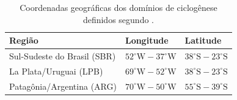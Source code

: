 \begin{table}[ht]
\centering
\caption[Coordenadas dos domínios de ciclogênese]{Coordenadas geográficas dos domínios de ciclogênese definidos segundo \citet{gramcianinov2019properties}.}
\label{tab:regiones_coords}
\begin{tabular*}{\textwidth}{@{\extracolsep{\fill}}lll}
\hline
Região & Longitude & Latitude \\
\hline
Sul-Sudeste do Brasil (SBR) & $52^\circ\text{W} - 37^\circ\text{W}$ & $38^\circ\text{S} - 23^\circ\text{S}$ \\
La Plata/Uruguai (LPB) & $69^\circ\text{W} - 52^\circ\text{W}$ & $38^\circ\text{S} - 23^\circ\text{S}$ \\
Patagônia/Argentina (ARG) & $70^\circ\text{W} - 50^\circ\text{W}$ & $55^\circ\text{S} - 39^\circ\text{S}$ \\
\hline
\end{tabular*}
\end{table}
